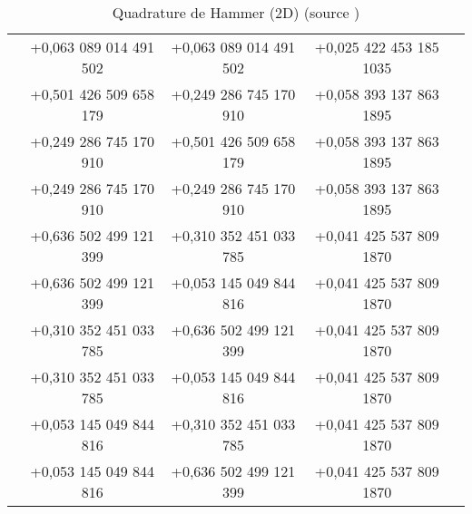 \begin{table}[H]
\begin{tabular}{|>{\bfseries}c|c|c|c|c|}
           & +0,063 089 014 491 502 & +0,063 089 014 491 502 & +0,025 422 453 185 1035 & \\
           & +0,501 426 509 658 179 & +0,249 286 745 170 910 & +0,058 393 137 863 1895 & \\
           & +0,249 286 745 170 910 & +0,501 426 509 658 179 & +0,058 393 137 863 1895 & \\
           & +0,249 286 745 170 910 & +0,249 286 745 170 910 & +0,058 393 137 863 1895 & \\
           & +0,636 502 499 121 399 & +0,310 352 451 033 785 & +0,041 425 537 809 1870 & \\
           & +0,636 502 499 121 399 & +0,053 145 049 844 816 & +0,041 425 537 809 1870 & \\
           & +0,310 352 451 033 785 & +0,636 502 499 121 399 & +0,041 425 537 809 1870 & \\
           & +0,310 352 451 033 785 & +0,053 145 049 844 816 & +0,041 425 537 809 1870 & \\
           & +0,053 145 049 844 816 & +0,310 352 451 033 785 & +0,041 425 537 809 1870 & \\
           & +0,053 145 049 844 816 & +0,636 502 499 121 399 & +0,041 425 537 809 1870 & \\
		\bottomrule
	\end{tabular}
	\label{tab:quad2d}
	\caption{Quadrature de Hammer (2D) (source \citet{fortin_les_2020})}
\end{table}